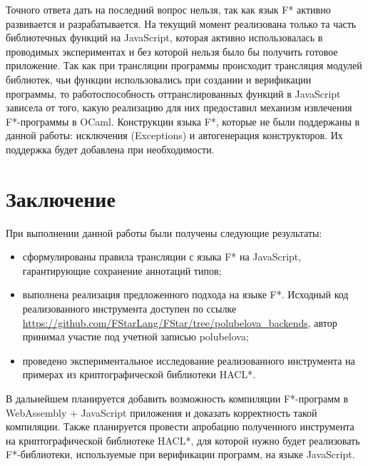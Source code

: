 Точного ответа дать на последний вопрос нельзя, так как язык F* активно развивается и разрабатывается. На текущий момент реализована только та часть библиотечных функций на JavaScript, которая активно использовалась в проводимых экспериментах и без которой нельзя было бы получить готовое приложение. Так как при трансляции программы происходит трансляция модулей библиотек, чьи функции использовались при создании и верификации программы, то работоспособность оттранслированных функций в JavaScript зависела от того, какую реализацию для них предоставил механизм извлечения F*-программы в OCaml. Конструкции языка F*, которые не были поддержаны в данной работы: исключения (Exceptions) и автогенерация конструкторов. Их поддержка будет добавлена при необходимости. 


\section*{Заключение}
При выполнении данной работы были получены следующие результаты:
\begin{itemize}
\item сформулированы правила трансляции с языка F* на JavaScript, гарантирующие сохранение аннотаций типов;
\item выполнена реализация предложенного подхода на языке F*. Исходный код реализованного инструмента доступен по ссылке {\small \url{https://github.com/FStarLang/FStar/tree/polubelova\_backends}}, автор принимал участие под учетной записью polubelova;
\item проведено экспериментальное исследование реализованного инструмента на примерах из криптографической библиотеки HACL*.
\end{itemize}

В дальнейшем планируется добавить возможность компиляции F*-программ в WebAssembly + JavaScript приложения и доказать корректность такой компиляции. Также планируется провести апробацию полученного инструмента на криптографической библиотеке HACL*, для которой нужно будет реализовать F*-библиотеки, используемые при верификации программ, на языке JavaScript.


